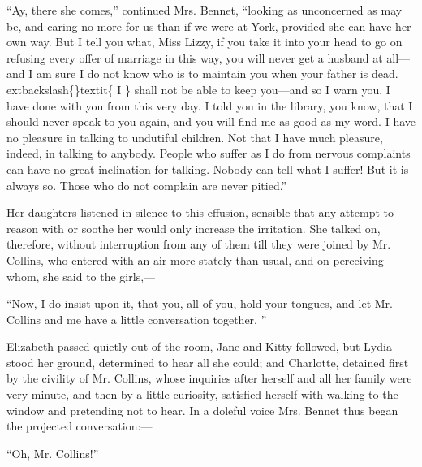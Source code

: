 \documentclass[10pt]{book}
\begin{document}
   “Ay, there she comes,” continued Mrs. Bennet, “looking as unconcerned as
may be, and caring no more for us than if we were at York, provided she
can have her own way. But I tell you what, Miss Lizzy, if you take it
into your head to go on refusing every offer of marriage in this way,
you will never get a husband at all—and I am sure I do not know who is
to maintain you when your father is dead.
   	extbackslash\{\}textit\{
    I
   \}
   shall not be able to keep
you—and so I warn you. I have done with you from this very day. I told
you in the library, you know, that I should never speak to you again,
and you will find me as good as my word. I have no pleasure in talking
to undutiful children. Not that I have much pleasure, indeed, in talking
to anybody. People who suffer as I do from nervous complaints can have
no great inclination for talking. Nobody can tell what I suffer! But it
is always so. Those who do not complain are never pitied.”
  

   Her daughters listened in silence to this effusion, sensible that any
attempt to reason with or soothe her would only increase the irritation.
She talked on, therefore, without interruption from any of them till
they were joined by Mr. Collins, who entered with an air more stately
than usual, and on perceiving whom, she said to the girls,—
  

   “Now, I do insist upon it, that you, all of you, hold your tongues, and
let Mr. Collins and me have a little conversation together.
   ”
  

   Elizabeth passed quietly out of the room, Jane and Kitty followed, but
Lydia stood her ground, determined to hear all she could; and Charlotte,
detained first by the civility of Mr. Collins, whose inquiries after
herself and all her family were very minute, and then by a little
curiosity, satisfied herself with walking to the window and pretending
not to hear. In a doleful voice Mrs. Bennet thus began the projected
conversation:—
  

   “Oh, Mr. Collins!”
  
\end{document}
